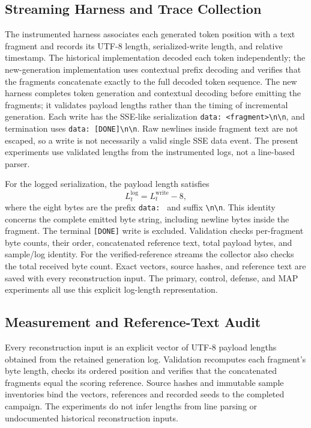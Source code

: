 \documentclass[electronics,article,submit,pdftex,moreauthors]{Definitions/mdpi}
\begin{document}
\subsection{Streaming Harness and Trace Collection}
The instrumented harness associates each generated token position with a text fragment and records its UTF-8 length, serialized-write length, and relative timestamp. The historical implementation decoded each token independently; the new-generation implementation uses contextual prefix decoding and verifies that the fragments concatenate exactly to the full decoded token sequence. The new harness completes token generation and contextual decoding before emitting the fragments; it validates payload lengths rather than the timing of incremental generation. Each write has the SSE-like serialization \texttt{data: \textless fragment\textgreater\textbackslash n\textbackslash n}, and termination uses \texttt{data: [DONE]\textbackslash n\textbackslash n}. Raw newlines inside fragment text are not escaped, so a write is not necessarily a valid single SSE data event. The present experiments use validated lengths from the instrumented logs, not a line-based parser.

For the logged serialization, the payload length satisfies
\begin{equation}
L^{\mathrm{log}}_t = L^{\mathrm{write}}_t - 8,
\end{equation}
where the eight bytes are the prefix \texttt{data: } and suffix \texttt{\textbackslash n\textbackslash n}. This identity concerns the complete emitted byte string, including newline bytes inside the fragment. The terminal \texttt{[DONE]} write is excluded. Validation checks per-fragment byte counts, their order, concatenated reference text, total payload bytes, and sample/log identity. For the verified-reference streams the collector also checks the total received byte count. Exact vectors, source hashes, and reference text are saved with every reconstruction input. The primary, control, defense, and MAP experiments all use this explicit log-length representation.

\subsection{Measurement and Reference-Text Audit}\label{sec:measurement-audit}
Every reconstruction input is an explicit vector of UTF-8 payload lengths obtained from the retained generation log. Validation recomputes each fragment's byte length, checks its ordered position and verifies that the concatenated fragments equal the scoring reference. Source hashes and immutable sample inventories bind the vectors, references and recorded seeds to the completed campaign. The experiments do not infer lengths from line parsing or undocumented historical reconstruction inputs.
\end{document}
